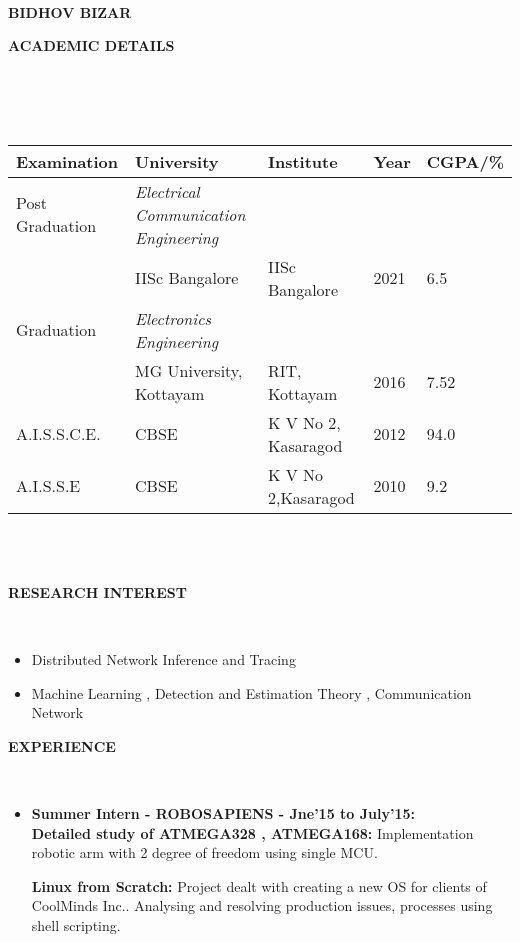 \documentclass[a4paper,10pt]{article}
\newcommand{\lsep}{-0.5cm}
\newcommand{\resheading}[1]{{\small \colorbox{MyBlue}{\begin{minipage}{0.975\textwidth}{\textbf{#1 \vphantom{p\^{E}}}}\end{minipage}}}}
\begin{document}
\hspace{0.5cm}\\[-0.2cm]

\textbf{\LARGE BIDHOV BIZAR} \\

\resheading{\textbf{ACADEMIC DETAILS} }\\[\lsep]
\\ \\
\indent \begin{tabular}{ l @{\hskip 0.15in} l @{\hskip 0.15in} l @{\hskip 0.15in} l @{\hskip 0.15in} l }
\hline
\textbf{Examination} & \textbf{University} & \textbf{Institute} & \textbf{Year} & \textbf{CGPA/\%} \\
\hline
Post Graduation \,\, & \textit{Electrical Communication Engineering} \\
 & IISc Bangalore & IISc Bangalore  & 2021 & 6.5 \\
Graduation & \textit{Electronics Engineering} \\
 & MG University, Kottayam & RIT, Kottayam & 2016 & 7.52\\
A.I.S.S.C.E. & CBSE& K V No 2, Kasaragod & 2012 & 94.0 \\
A.I.S.S.E & CBSE & K V No 2,Kasaragod & 2010 & 9.2 \\
\hline
\end{tabular}
\\ \\

\resheading{\textbf{RESEARCH INTEREST} }\\[\lsep]
\begin{itemize}
\item \noindent Distributed Network Inference and Tracing
\item \noindent Machine Learning , Detection and Estimation Theory , Communication Network
\end{itemize}

\resheading{\textbf{EXPERIENCE} }\\[\lsep]
\begin{itemize}
\item \noindent \textbf{Summer Intern - ROBOSAPIENS -  Jne'15  to  July'15:} \\
\textbf{Detailed study of ATMEGA328 , ATMEGA168: } Implementation robotic arm with 2 degree of freedom using single MCU.

\textbf{Linux from Scratch:}
Project  dealt  with  creating a new OS for clients of CoolMinds Inc..  Analysing  and  resolving  production  issues,  processes  using shell scripting.

\end{itemize}
\end{document}
